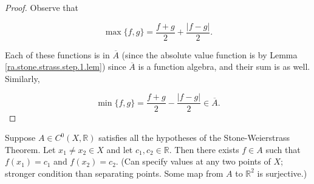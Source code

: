 \begin{proof}

Observe that 

\[
\max\{f,g\} = \frac{f +g}{2} + \frac{ |f - g|}{2}.
\] 

Each of these functions is in \(\overline{A}\) (since the absolute value function is by Lemma \ref{ra.stone.strass.step.1.lem}) since \(\overline{A}\) is a function algebra, and their sum is as well. Similarly,

\[
\min\{f,g\} = \frac{f +g}{2} - \frac{ |f - g|}{2} \in \overline{A}.
\] 

\end{proof}


\begin{lemma}\label{ra.stone.strass.thm.7.31}

Suppose \(A \in C^0(X, \mathbb{R})\) satisfies all the hypotheses of the Stone-Weierstrass Theorem. Let \(x_1 \neq x_2 \in X\) and let \(c_1, c_2 \in \mathbb{R}\). Then there exists \(f \in A\) such that \(f(x_1) = c_1\) and \(f(x_2) = c_2\). (Can specify values at any two points of \(X\); stronger condition than separating points. Some map from \(A\) to \(\mathbb{R}^2\) is surjective.)

\end{lemma}

